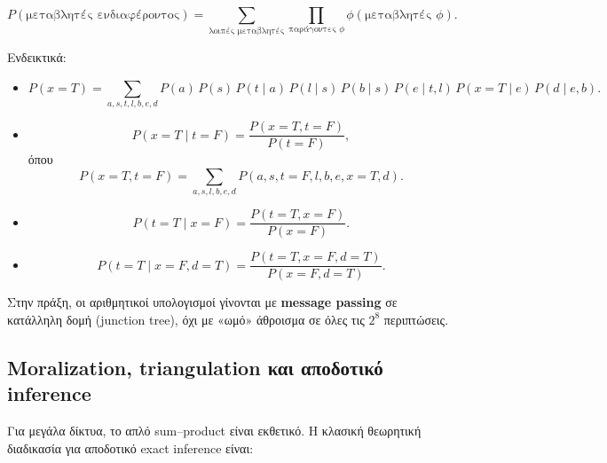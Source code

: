 \documentclass[a4paper,11pt]{article}
\begin{document}
\[
P(\text{μεταβλητές ενδιαφέροντος})
= \sum_{\text{λοιπές μεταβλητές}} \prod_{\text{παράγοντες } \phi}
  \phi(\text{μεταβλητές } \phi).
\]

Ενδεικτικά:

\begin{itemize}
  \item
    \[
    P(x=T)
    = \sum_{a,s,t,l,b,e,d}
      P(a)\,P(s)\,P(t \mid a)\,P(l \mid s)\,P(b \mid s)\,
      P(e \mid t,l)\,P(x=T \mid e)\,P(d \mid e,b).
    \]
  \item
    \[
    P(x=T\mid t=F)
    = \frac{P(x=T,t=F)}{P(t=F)},
    \]
    όπου
    \[
    P(x=T,t=F)
    = \sum_{a,s,l,b,e,d}
      P(a,s,t=F,l,b,e,x=T,d).
    \]
  \item
    \[
    P(t=T\mid x=F)
    = \frac{P(t=T,x=F)}{P(x=F)}.
    \]
  \item
    \[
    P(t=T\mid x=F,d=T)
    = \frac{P(t=T,x=F,d=T)}{P(x=F,d=T)}.
    \]
\end{itemize}

Στην πράξη, οι αριθμητικοί υπολογισμοί γίνονται με
\textbf{message passing} σε κατάλληλη δομή (junction tree), όχι με
«ωμό» άθροισμα σε όλες τις $2^8$ περιπτώσεις.

\subsection{Moralization, triangulation και αποδοτικό inference}

Για μεγάλα δίκτυα, το απλό sum–product είναι εκθετικό. Η κλασική
θεωρητική διαδικασία για αποδοτικό exact inference είναι:
\end{document}
